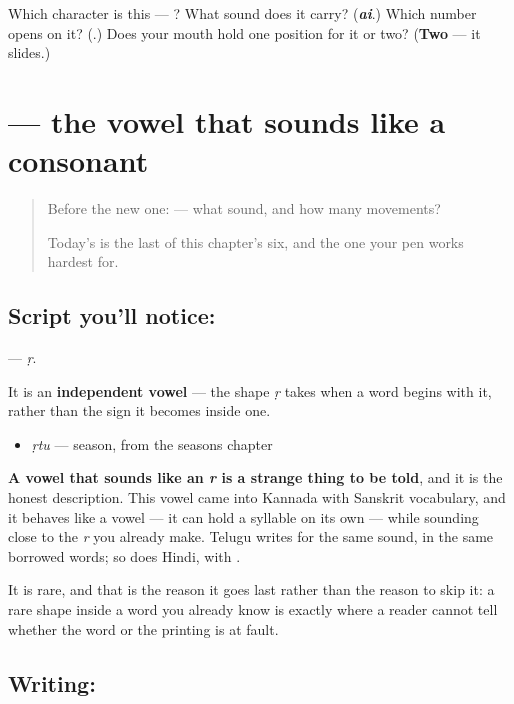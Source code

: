 \begin{tcolorbox}[breakable,colback=teal!4,colframe=teal!35!black,title={Before you move on}]
Which character is this — ? What sound does it carry? (\emph{\textbf{ai}}.) Which number opens on it? (\textbf{}.) Does your mouth hold one position for it or two? (\textbf{Two} — it slides.)
\end{tcolorbox}
\section[\texorpdfstring{\kn{ಋ} (ṛ)}{ಋ (ṛ)}]{ — the vowel that sounds like a consonant}

\label{lesson:KA-S160-letter-vocalic-r}



\begin{quote}
Before the new one:  — what sound, and how many movements?

Today's is the last of this chapter's six, and the one your pen works hardest for.
\end{quote}

\subsection*{Script you'll notice: }
\textbf{} — \emph{ṛ}.

It is an \textbf{independent vowel} — the shape \emph{ṛ} takes when a word begins with it, rather than the sign it becomes inside one.

\begin{itemize}
\raggedright
  \item \textbf{} \emph{ṛtu} — season, from the seasons chapter
\end{itemize}

\textbf{A vowel that sounds like an \emph{r} is a strange thing to be told}, and it is the honest description. This vowel came into Kannada with Sanskrit vocabulary, and it behaves like a vowel — it can hold a syllable on its own — while sounding close to the \emph{r} you already make. Telugu writes  for the same sound, in the same borrowed words; so does Hindi, with .

It is rare, and that is the reason it goes last rather than the reason to skip it: a rare shape inside a word you already know is exactly where a reader cannot tell whether the word or the printing is at fault.

\subsection*{Writing: }


